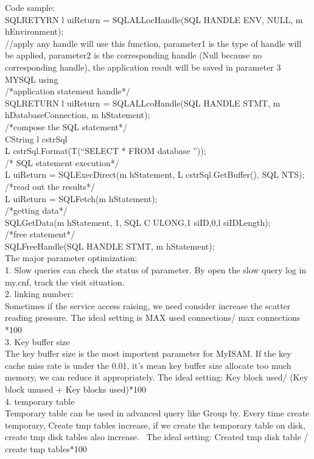 \documentclass[onecolumn, draftclsnofoot,10pt, compsoc]{IEEEtran}
\begin{document}
Code sample: \\
SQLRETYRN l uiReturn = SQLALLocHandle(SQL HANDLE ENV, NULL, m hEnvironment);\\
//apply any handle will use this function, parameter1 is the type of handle will be applied, parameter2 is the corresponding handle (Null because no corresponding handle), the application result will be saved in parameter 3\\

MYSQL using\\
/*application statement handle*/\\
SQLRETURN l uiReturn = SQLALLcoHandle(SQL HANDLE STMT, m hDatabaseConnection, m hStatement); \\

/*compose the SQL statement*/\\ 
CString l cstrSql\\
L cstrSql.Format(T(“SELECT * FROM database ”));\\

/* SQL statement execution*/\\
L uiReturn = SQLExecDirect(m hStatement, L cstrSql.GetBuffer(), SQL NTS);\\ 

/*read out the results*/\\
L uiReturn = SQLFetch(m hStatement); \\
/*getting data*/\\
SQLGetData(m hStatement, 1, SQL C ULONG,1 siID,0,l siIDLength); \\

/*free statement*/\\
SQLFreeHandle(SQL HANDLE STMT, m hStatement);\\ 


The major parameter optimization:\\
1. Slow queries can check the status of parameter. By open the slow query log in my.cnf, track the visit situation.\\ 

2. linking number:\\
Sometimes if the service access raising, we need consider increase the scatter reading pressure. The ideal setting is MAX used connections/ max connections *100\\

3. Key buffer size \\
The key buffer size is the most importent parameter for MyISAM. If the key cache miss rate is under the 0.01, it's mean key buffer size allocate too much memory, we can reduce it appropriately. 
The ideal setting: Key block used/ (Key block unused + Key blocks used)*100\\%
4. temporary table\\
Temporary table can be used in advanced query like Group by. Every time create temporary, Create tmp tables increase, if we create the temporary table on disk, create tmp disk tables also increase. \
The ideal setting: Created tmp disk table / create tmp tables*100\\%
\end{document}
